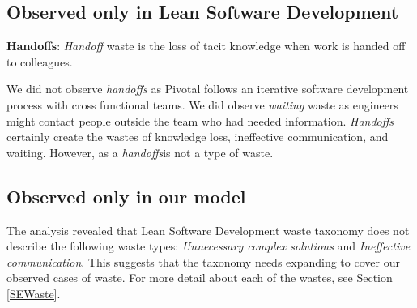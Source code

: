\subsection{Observed only in Lean Software Development}

\textbf{Handoffs}: \textit{Handoff} waste is the loss of tacit knowledge when work is handed off to colleagues.

We did not observe \textit{handoffs} as Pivotal follows an iterative software development process with cross functional teams. We did observe \textit{waiting} waste as engineers might contact people outside the team who had needed information. \textit{Handoffs} certainly create the wastes of knowledge loss, ineffective communication, and waiting. However, as a \textit{handoffs}is not a type of waste.

\subsection{Observed only in our model}
The analysis revealed that Lean Software Development waste taxonomy does not describe the following waste types: \textit{Unnecessary complex solutions} and \textit{Ineffective communication}. This suggests that the taxonomy needs expanding to cover our observed cases of waste. For more detail about each of the wastes, see Section \ref{SEWaste}.
